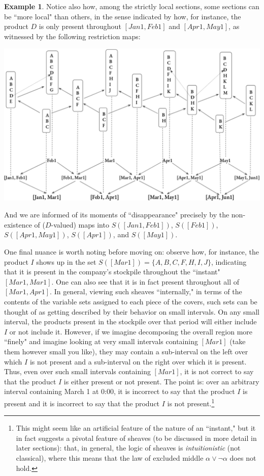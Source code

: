\documentclass[11pt]{book}
\theoremstyle{definition}
\newtheorem{example}{Example}[section]
\theoremstyle{definition}
\theoremstyle{definition}
\theoremstyle{theorem}
\theoremstyle{definition}
\begin{document}
\begin{example}
	Notice also how, among the strictly local sections, some sections can be ``more local" than others, in the sense indicated by how, for instance, the product $D$ is only present throughout $[Jan1, Feb1]$ and $[Apr1,May1]$, as witnessed by the following restriction maps:   
	\begin{center}
		\includegraphics*[scale=0.25]{DSmallerLocalSectionInterval.png}
	\end{center}     
	And we are informed of its moments of ``disappearance" precisely by the non-existence of ($D$-valued) maps into $S([Jan1, Feb1])$, $S([Feb1])$, $S([Apr1, May1])$, $S([Apr1])$, and $S([May1])$. \par 
	One final nuance is worth noting before moving on: observe how, for instance, the product $I$ shows up in the set $S([Mar1]) = \{A,B,C,F,H,I,J\}$, indicating that it is present in the company's stockpile throughout the ``instant" $[Mar1, Mar1]$. One can also see that it is in fact present throughout all of $[Mar1, Apr1]$. In general, viewing such sheaves ``internally," in terms of the contents of the variable sets assigned to each piece of the covers, such sets can be thought of as getting described by their behavior on small intervals. On any small interval, the products present in the stockpile over that period will either include $I$ or not include it. However, if we imagine decomposing the overall region more ``finely" and imagine looking at very small intervals containing $[Mar1]$ (take them however small you like), they may contain a sub-interval on the left over which $I$ is not present and a sub-interval on the right over which it is present. Thus, even over such small intervals containing $[Mar1]$, it is not correct to say that the product $I$ is either present or not present. The point is: over an arbitrary interval containing March 1 at 0:00, it is incorrect to say that the product $I$ is present and it is incorrect to say that the product $I$ is not present.\footnote{This might seem like an artificial feature of the nature of an ``instant," but it in fact suggests a pivotal feature of sheaves (to be discussed in more detail in later sections): that, in general, the logic of sheaves is \textit{intuitionistic} (not classical), where this means that the law of excluded middle $\alpha \vee \neg \alpha$ does not hold.}       
\end{example}
\end{document}
